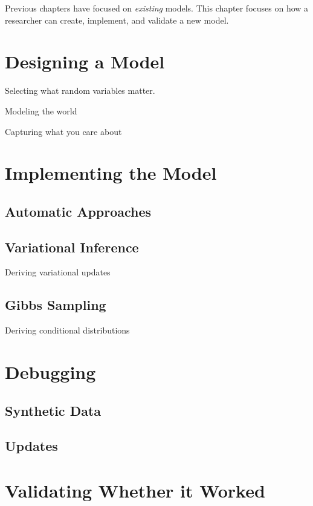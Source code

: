 
Previous chapters have focused on \emph{existing} models.  This
chapter focuses on how a researcher can create, implement, and
validate a new model.

\section{Designing a Model}

Selecting what random variables matter.

Modeling the world

Capturing what you care about

\section{Implementing the Model}

\subsection{Automatic Approaches}

\subsection{Variational Inference}

Deriving variational updates

\subsection{Gibbs Sampling}

Deriving conditional distributions

\section{Debugging}

\subsection{Synthetic Data}

\subsection{Updates}

\section{Validating Whether it Worked}

